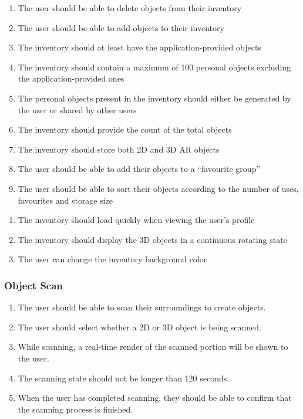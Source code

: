 \documentclass{article}
\begin{document}
\begin{enumerate}[align=left, label=\textbf{IV-FR\arabic*:}]
    \item The user should be able to delete objects from their inventory
    \item The user should be able to add objects to their inventory
    \item The inventory should at least have the application-provided objects
    \item The inventory should contain a maximum of 100 personal objects excluding the application-provided ones
    \item The personal objects present in the inventory should either be generated by the user or shared by other users
    \item The inventory should provide the count of the total objects
    \item The inventory should store both 2D and 3D AR objects
    \item The user should be able to add their objects to a “favourite group”
    \item The user should be able to sort their objects according to the number of uses, favourites and storage size
\end{enumerate}

\begin{enumerate}[align=left, label=\textbf{IV-NFR\arabic*:}]
    \item The inventory should load quickly when viewing the user’s profile
    \item The inventory should display the 3D objects in a continuous rotating state
    \item The user can change the inventory background color
\end{enumerate}

\subsubsection{Object Scan}
\label{ssub:obj_scan}
\begin{enumerate}[label=OS-FR\arabic*:]
    \item The user should be able to scan their surroundings to create objects.
    \item The user should select whether a 2D or 3D object is being scanned.
    \item While scanning, a real-time render of the scanned portion will be shown to the user.
    \item The scanning state should not be longer than 120 seconds.
    \item When the user has completed scanning, they should be able to confirm that the scanning process is finished.
\end{enumerate}
\end{document}
